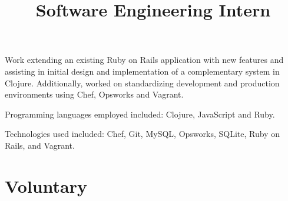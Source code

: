 \documentclass[margintitle,line]{res}
\renewcommand{\subsection}[1]{\section{\normalfont #1}}
\begin{document}
\begin{resume}
\title{Software Engineering Intern}
\begin{position}
 Work extending an existing Ruby on Rails application with new
 features and assisting in initial design and implementation of a
 complementary system in  Clojure. Additionally, worked on
 standardizing development and production environments using Chef,
 Opsworks and Vagrant.

 Programming languages employed included: Clojure, JavaScript and Ruby.

 Technologies used included: Chef, Git, MySQL, Opsworks, SQLite,
 Ruby on Rails, and Vagrant.
\end{position}




%
\subsection{Voluntary}


\end{resume}
\end{document}
